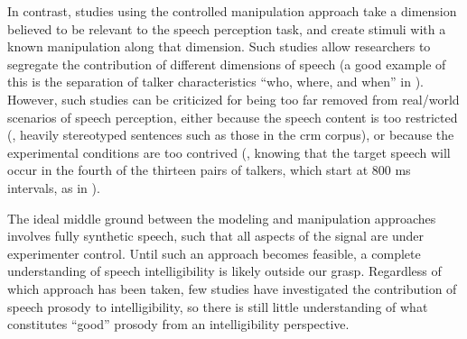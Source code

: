 In contrast, studies using the controlled manipulation approach take a dimension believed to be relevant to the speech perception task, and create stimuli with a known manipulation along that dimension.\footnotemark{}  Such studies allow researchers to segregate the contribution of different dimensions of speech (a good example of this is the separation of talker characteristics “who, where, and when” in \citealt{KitterickEtAl2010}).  However, such studies can be criticized for being too far removed from real\-/world scenarios of speech perception, either because the speech content is too restricted (\ie, heavily stereotyped sentences such as those in the \ac{crm} corpus), or because the experimental conditions are too contrived (\eg, knowing that the target speech will occur in the fourth of the thirteen pairs of talkers, which start at 800 ms intervals, as in \citealt{KitterickEtAl2010}).

The ideal middle ground between the modeling and manipulation approaches involves fully synthetic speech, such that all aspects of the signal are under experimenter control.  Until such an approach becomes feasible, a complete understanding of speech intelligibility is likely outside our grasp.  Regardless of which approach has been taken, few studies have investigated the contribution of speech prosody to intelligibility, so there is still little understanding of what constitutes “good” prosody from an intelligibility perspective.



